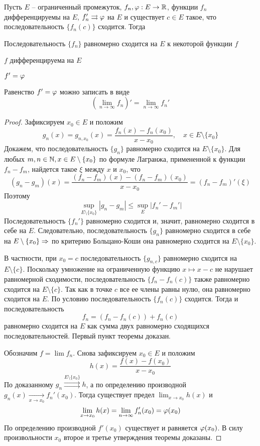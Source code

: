 \begin{Thm}
	Пусть $E$ -- ограниченный промежуток, $f_n, \varphi : E \to \mathbb{R}$, функции $f_n$ дифференцируемы на $E$, $f_n' \rightrightarrows \varphi$ на $E$ и существует $c \in E$ такое, что последовательность $\{f_n(c)\}$ сходится.
	Тогда
	\begin{MyList}
		\item Последовательность $\{f_n\}$ равномерно сходится на $E$ к некоторой функции $f$
		\item $f$ дифференцируема на $E$ 
		\item $f' = \varphi$ 
	\end{MyList}
	Равенство $f' = \varphi$ можно записать в виде
	\[\left(\lim_{n \to \infty} f_n\right)' = \lim_{n \to \infty} f_n'\]
\end{Thm}

\begin{proof}
	Зафиксируем $x_0 \in E$ и положим
	\[g_n(x) = g_{n, x_0}(x) = \frac{f_n(x) - f_n(x_0)}{x - x_0}, \quad x \in E \setminus \{x_0\}\]
	Докажем, что последовательность $\{g_n\}$ равномерно сходится на $E \setminus \{x_0\}$. 
	Для любых $m, n \in \mathbb{N}, x \in E \setminus \{x_0\}$ по формуле Лагранжа, примененной к функции $f_n - f_m$, найдется такое $\xi$ между $x$ и $x_0$, что
	\[(g_n - g_m)(x) = \frac{(f_n - f_m)(x) - (f_n - f_m)(x_0)}{x - x_0} = (f_n - f_m)' (\xi)\]
	Поэтому
	\[\sup_{E \setminus \{x_0\}} |g_n - g_m| \leqslant \sup_E |f_n' - f_m'|\]
	Последовательность $\{f_n'\}$ равномерно сходится и, значит, равномерно сходится в себе на $E$.
	Следовательно, последовательность $\{g_n\}$ равномерно сходится в себе на $E \setminus \{x_0\} \Rightarrow$ по критерию Больцано-Коши она равномерно сходится на $E \setminus \{x_0\}$. 

	В частности, при $x_0 = c$ последовательность $\{g_{n, c}\}$ равномерно сходится на $E \setminus \{c\}$. Поскольку умножение на ограниченную функцию $x \mapsto x - c$ не нарушает равномерной сходимости,
	последовательность $\{f_n - f_n(c)\}$ также равномерно сходится на $E \setminus \{c\}$. Так как в точке $c$ все ее члены равны нулю, она равномерно сходится на $E$.
	По условию последовательность $\{f_n(c)\}$ сходится. Тогда и последовательность
	\[f_n = \left(f_n - f_n(c)\right) + f_n(c)\] 
	равномерно сходится на $E$ как сумма двух равномерно сходящихся последовательностей. Первый пункт теоремы доказан.

	Обозначим $f = \lim f_n$. Снова зафиксируем $x_0 \in E$ и положим
	\[h(x) = \frac{f(x) - f(x_0)}{x - x_0}\]
	По доказанному $g_n \overset{E \setminus \{x_0\}}{\rightrightarrows} h$, а по определению производной $g_n(x) \xrightarrow[x \to x_0]{} f_n'(x_0)$. Тогда существует предел $\lim_{x \to x_0} h(x)$ и
	\[\lim_{x \to x_0} h(x) = \lim_{n \to \infty} f_n'(x_0) = \varphi(x_0)\]
	По определению производной $f'(x_0)$ существует и равняется $\varphi(x_0)$.
	В силу произвольности $x_0$ второе и третье утверждения теоремы доказаны.  
\end{proof}

